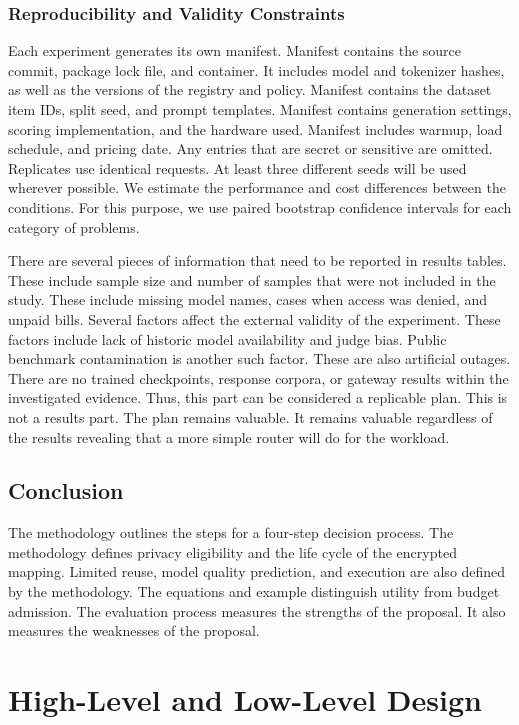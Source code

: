 \documentclass{FastFyp}
\begin{document}
\subsection{Reproducibility and Validity Constraints}
Each experiment generates its own manifest.
Manifest contains the source commit, package lock file, and container.
It includes model and tokenizer hashes, as well as the versions of the registry and policy.
Manifest contains the dataset item IDs, split seed, and prompt templates.
Manifest contains generation settings, scoring implementation, and the hardware used.
Manifest includes warmup, load schedule, and pricing date.
Any entries that are secret or sensitive are omitted.
Replicates use identical requests.
At least three different seeds will be used wherever possible.
We estimate the performance and cost differences between the conditions.
For this purpose, we use paired bootstrap confidence intervals for each category of problems.

There are several pieces of information that need to be reported in results tables.
These include sample size and number of samples that were not included in the study.
These include missing model names, cases when access was denied, and unpaid bills.
Several factors affect the external validity of the experiment.
These factors include lack of historic model availability and judge bias.
Public benchmark contamination is another such factor.
These are also artificial outages.
There are no trained checkpoints, response corpora, or gateway results within the investigated evidence.
Thus, this part can be considered a replicable plan.
This is not a results part.
The plan remains valuable.
It remains valuable regardless of the results revealing that a more simple router will do for the workload.

\section{Conclusion}
\label{sec:ch5-conclusion}
The methodology outlines the steps for a four-step decision process.
The methodology defines privacy eligibility and the life cycle of the encrypted mapping.
Limited reuse, model quality prediction, and execution are also defined by the methodology.
The equations and example distinguish utility from budget admission.
The evaluation process measures the strengths of the proposal.
It also measures the weaknesses of the proposal.

\chapter{High-Level and Low-Level Design}
\label{ch:design}
\end{document}
